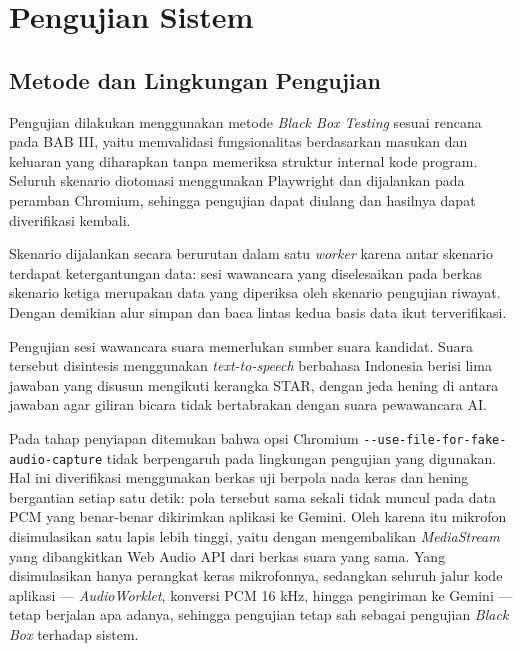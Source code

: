 \documentclass[12pt,a4paper,oneside]{report}
\begin{document}
\section{Pengujian Sistem}

\subsection{Metode dan Lingkungan Pengujian}

Pengujian dilakukan menggunakan metode \textit{Black Box Testing} sesuai
rencana pada BAB III, yaitu memvalidasi fungsionalitas berdasarkan masukan dan
keluaran yang diharapkan tanpa memeriksa struktur internal kode program.
Seluruh skenario diotomasi menggunakan Playwright dan dijalankan pada peramban
Chromium, sehingga pengujian dapat diulang dan hasilnya dapat diverifikasi
kembali.

Skenario dijalankan secara berurutan dalam satu \textit{worker} karena antar
skenario terdapat ketergantungan data: sesi wawancara yang diselesaikan pada
berkas skenario ketiga merupakan data yang diperiksa oleh skenario pengujian
riwayat. Dengan demikian alur simpan dan baca lintas kedua basis data ikut
terverifikasi.

Pengujian sesi wawancara suara memerlukan sumber suara kandidat. Suara
tersebut disintesis menggunakan \textit{text-to-speech} berbahasa Indonesia
berisi lima jawaban yang disusun mengikuti kerangka STAR, dengan jeda hening
di antara jawaban agar giliran bicara tidak bertabrakan dengan suara
pewawancara AI.

Pada tahap penyiapan ditemukan bahwa opsi Chromium
\texttt{-{}-use-file-for-}\allowbreak\texttt{fake-audio-capture} tidak berpengaruh pada
lingkungan pengujian yang digunakan. Hal ini diverifikasi menggunakan berkas
uji berpola nada keras dan hening bergantian setiap satu detik: pola tersebut
sama sekali tidak muncul pada data PCM yang benar-benar dikirimkan aplikasi ke
Gemini. Oleh karena itu mikrofon disimulasikan satu lapis lebih tinggi, yaitu
dengan mengembalikan \textit{MediaStream} yang dibangkitkan Web Audio API dari
berkas suara yang sama. Yang disimulasikan hanya perangkat keras mikrofonnya,
sedangkan seluruh jalur kode aplikasi --- \textit{AudioWorklet}, konversi PCM
16 kHz, hingga pengiriman ke Gemini --- tetap berjalan apa adanya, sehingga
pengujian tetap sah sebagai pengujian \textit{Black Box} terhadap sistem.
\end{document}
